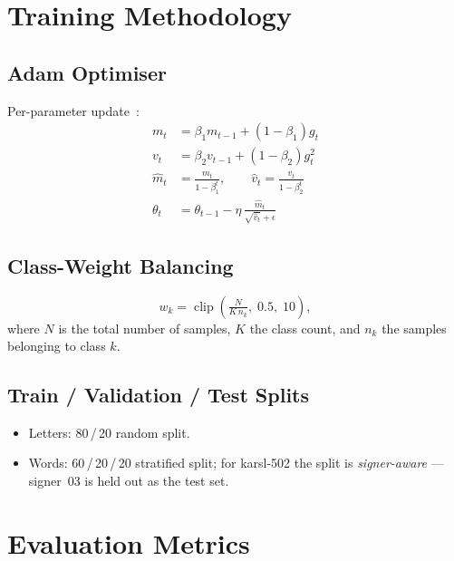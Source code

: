 \section{Training Methodology}
\label{sec:meth:train}

\subsection{Adam Optimiser}
\label{sec:meth:adam}
Per-parameter update~\cite{kingma2015adam}:
\begin{equation}
\begin{aligned}
  m_t &= \beta_1 m_{t-1} + (1-\beta_1) g_t \\
  v_t &= \beta_2 v_{t-1} + (1-\beta_2) g_t^2 \\
  \hat m_t &= \tfrac{m_t}{1 - \beta_1^t},\qquad
  \hat v_t  = \tfrac{v_t}{1 - \beta_2^t} \\
  \theta_t &= \theta_{t-1} - \eta\,\tfrac{\hat m_t}{\sqrt{\hat v_t} + \epsilon}
\end{aligned}
\end{equation}

\subsection{Class-Weight Balancing}
\label{sec:meth:weights}
\begin{equation}
  w_k = \operatorname{clip}\!\left(\tfrac{N}{K\,n_k},\;0.5,\;10\right),
\end{equation}
where $N$ is the total number of samples, $K$ the class count, and $n_k$
the samples belonging to class $k$.

\subsection{Train / Validation / Test Splits}
\label{sec:meth:splits}
\begin{itemize}
  \item Letters: 80\,/\,20 random split.
  \item Words: 60\,/\,20\,/\,20 stratified split; for \gls{karsl}-502
        the split is \emph{signer-aware} --- signer~03 is held out as the
        test set.
\end{itemize}

\section{Evaluation Metrics}
\label{sec:meth:metrics}

